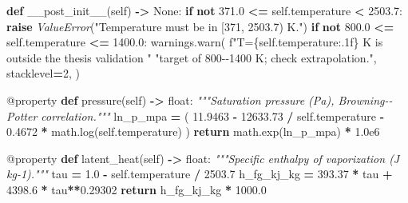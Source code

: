 \documentclass[
  12pt,a4paper,oneside]{report}
\newenvironment{Shaded}{\begin{snugshade}}{\end{snugshade}}
\newcommand{\AttributeTok}[1]{\textcolor[rgb]{0.77,0.63,0.00}{#1}}
\newcommand{\BuiltInTok}[1]{#1}
\newcommand{\CommentTok}[1]{\textcolor[rgb]{0.56,0.35,0.01}{\textit{#1}}}
\newcommand{\ControlFlowTok}[1]{\textcolor[rgb]{0.13,0.29,0.53}{\textbf{#1}}}
\newcommand{\DecValTok}[1]{\textcolor[rgb]{0.00,0.00,0.81}{#1}}
\newcommand{\FloatTok}[1]{\textcolor[rgb]{0.00,0.00,0.81}{#1}}
\newcommand{\KeywordTok}[1]{\textcolor[rgb]{0.13,0.29,0.53}{\textbf{#1}}}
\newcommand{\NormalTok}[1]{#1}
\newcommand{\OperatorTok}[1]{\textcolor[rgb]{0.81,0.36,0.00}{\textbf{#1}}}
\newcommand{\PreprocessorTok}[1]{\textcolor[rgb]{0.56,0.35,0.01}{\textit{#1}}}
\newcommand{\SpecialCharTok}[1]{\textcolor[rgb]{0.00,0.00,0.00}{#1}}
\newcommand{\SpecialStringTok}[1]{\textcolor[rgb]{0.31,0.60,0.02}{#1}}
\newcommand{\StringTok}[1]{\textcolor[rgb]{0.31,0.60,0.02}{#1}}
\newcommand{\VariableTok}[1]{\textcolor[rgb]{0.00,0.00,0.00}{#1}}
\begin{document}
\begin{Shaded}
\begin{Highlighting}[]
    \KeywordTok{def}\NormalTok{ \_\_post\_init\_\_(}\VariableTok{self}\NormalTok{) }\OperatorTok{{-}\textgreater{}} \VariableTok{None}\NormalTok{:}
        \ControlFlowTok{if} \KeywordTok{not} \FloatTok{371.0} \OperatorTok{\textless{}=} \VariableTok{self}\NormalTok{.temperature }\OperatorTok{\textless{}} \FloatTok{2503.7}\NormalTok{:}
            \ControlFlowTok{raise} \PreprocessorTok{ValueError}\NormalTok{(}\StringTok{"Temperature must be in [371, 2503.7) K."}\NormalTok{)}
        \ControlFlowTok{if} \KeywordTok{not} \FloatTok{800.0} \OperatorTok{\textless{}=} \VariableTok{self}\NormalTok{.temperature }\OperatorTok{\textless{}=} \FloatTok{1400.0}\NormalTok{:}
\NormalTok{            warnings.warn(}
                \SpecialStringTok{f"T=}\SpecialCharTok{\{}\VariableTok{self}\SpecialCharTok{.}\NormalTok{temperature}\SpecialCharTok{:.1f\}}\SpecialStringTok{ K is outside the thesis validation "}
                \StringTok{"target of 800{-}{-}1400 K; check extrapolation."}\NormalTok{,}
\NormalTok{                stacklevel}\OperatorTok{=}\DecValTok{2}\NormalTok{,}
\NormalTok{            )}

    \AttributeTok{@property}
    \KeywordTok{def}\NormalTok{ pressure(}\VariableTok{self}\NormalTok{) }\OperatorTok{{-}\textgreater{}} \BuiltInTok{float}\NormalTok{:}
        \CommentTok{"""Saturation pressure (Pa), Browning{-}{-}Potter correlation."""}
\NormalTok{        ln\_p\_mpa }\OperatorTok{=}\NormalTok{ (}
            \FloatTok{11.9463} \OperatorTok{{-}} \FloatTok{12633.73} \OperatorTok{/} \VariableTok{self}\NormalTok{.temperature}
            \OperatorTok{{-}} \FloatTok{0.4672} \OperatorTok{*}\NormalTok{ math.log(}\VariableTok{self}\NormalTok{.temperature)}
\NormalTok{        )}
        \ControlFlowTok{return}\NormalTok{ math.exp(ln\_p\_mpa) }\OperatorTok{*} \FloatTok{1.0e6}

    \AttributeTok{@property}
    \KeywordTok{def}\NormalTok{ latent\_heat(}\VariableTok{self}\NormalTok{) }\OperatorTok{{-}\textgreater{}} \BuiltInTok{float}\NormalTok{:}
        \CommentTok{"""Specific enthalpy of vaporization (J kg{-}1)."""}
\NormalTok{        tau }\OperatorTok{=} \FloatTok{1.0} \OperatorTok{{-}} \VariableTok{self}\NormalTok{.temperature }\OperatorTok{/} \FloatTok{2503.7}
\NormalTok{        h\_fg\_kj\_kg }\OperatorTok{=} \FloatTok{393.37} \OperatorTok{*}\NormalTok{ tau }\OperatorTok{+} \FloatTok{4398.6} \OperatorTok{*}\NormalTok{ tau}\OperatorTok{**}\FloatTok{0.29302}
        \ControlFlowTok{return}\NormalTok{ h\_fg\_kj\_kg }\OperatorTok{*} \FloatTok{1000.0}


\end{Highlighting}
\end{Shaded}
\end{document}
